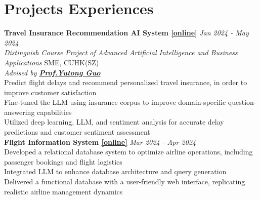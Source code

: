 \documentclass[a4paper,8pt]{article}
\begin{document}
\section*{Projects Experiences}
\textbf{Travel Insurance Recommendation AI System \href{https://tobyyang7.github.io/assets/pdf/Travel_Delay_Insurance_Recommendation_AI_System.pdf}{[online]}} \hfill \textit{Jan 2024 - May 2024}\\
\textit{Distinguish Course Project of Advanced Artificial Intelligence and Business Applications} \hfill SME, CUHK(SZ)\\
\textit{Advised by \textbf{\href{https://myweb.cuhk.edu.cn/guoyutong/Home/Index}{Prof.\@ Yutong Guo}}}\\
\textbullet Predict flight delays and recommend personalized travel insurance, in order to improve customer satisfaction\\
\textbullet Fine-tuned the LLM using insurance corpus to improve domain-specific question-answering capabilities\\
\textbullet Utilized deep learning, LLM, and sentiment analysis for accurate delay predictions and customer sentiment assessment\\
\textbf{Flight Information System \href{https://github.com/TobyYang7/Flight-Information-System}{[online]}} \hfill \textit{Mar 2024 - Apr 2024}\\
\textbullet Developed a relational database system to optimize airline operations, including passenger bookings and flight logistics\\
\textbullet Integrated LLM to enhance database architecture and query generation\\
\textbullet Delivered a functional database with a user-friendly web interface, replicating realistic airline management dynamics\\
\end{document}
